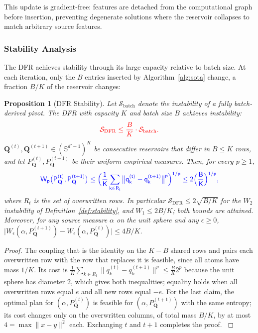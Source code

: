 \documentclass[preprint,12pt]{elsarticle}
\newtheorem{proposition}[theorem]{Proposition}
\providecommand{\DIFadd}[1]{{\protect\color{blue} \sf #1}} %
\providecommand{\DIFdel}[1]{{\protect\color{red} \scriptsize #1}} %
\providecommand{\DIFaddbegin}{} %
\providecommand{\DIFaddend}{} %
\providecommand{\DIFdelbegin}{} %
\providecommand{\DIFdelend}{} %
\newcommand{\DIFscaledelfig}{0.5}
\newlength{\DIFdelgraphicswidth} %
\newlength{\DIFdelgraphicsheight} %
\newcommand{\DIFaddincludegraphics}[2][]{{\color{blue}\fbox{\DIFOincludegraphics[#1]{#2}}}} %
\newcommand{\DIFdelincludegraphics}[2][]{%
\sbox{\DIFdelgraphicsbox}{\DIFOincludegraphics[#1]{#2}}%
\settoboxwidth{\DIFdelgraphicswidth}{\DIFdelgraphicsbox} %
\settoboxtotalheight{\DIFdelgraphicsheight}{\DIFdelgraphicsbox} %
\scalebox{\DIFscaledelfig}{%
\parbox[b]{\DIFdelgraphicswidth}{\usebox{\DIFdelgraphicsbox}\\[-\baselineskip] \rule{\DIFdelgraphicswidth}{0em}}\llap{\resizebox{\DIFdelgraphicswidth}{\DIFdelgraphicsheight}{%
\setlength{\unitlength}{\DIFdelgraphicswidth}%
\begin{picture}(1,1)%
\thicklines\linethickness{2pt} %
{\color[rgb]{1,0,0}\put(0,0){\framebox(1,1){}}}%
{\color[rgb]{1,0,0}\put(0,0){\line( 1,1){1}}}%
{\color[rgb]{1,0,0}\put(0,1){\line(1,-1){1}}}%
\end{picture}%
}\hspace*{3pt}}} %
} %
\DeclareRobustCommand{\DIFaddbegin}{\DIFOaddbegin \let\includegraphics\DIFaddincludegraphics} %
\DeclareRobustCommand{\DIFaddend}{\DIFOaddend \let\includegraphics\DIFOincludegraphics} %
\DeclareRobustCommand{\DIFdelbegin}{\DIFOdelbegin \let\includegraphics\DIFdelincludegraphics} %
\DeclareRobustCommand{\DIFdelend}{\DIFOaddend \let\includegraphics\DIFOincludegraphics} %
\begin{document}
This update is gradient-free: features are detached from the computational graph before insertion, preventing degenerate solutions where the reservoir collapses to match arbitrary source features.

\subsubsection{Stability Analysis}

The DFR achieves stability through its large capacity relative to batch size. At each iteration, only \DIFaddbegin \DIFadd{the $B$ entries inserted by Algorithm~\ref{alg:sota} change, a }\DIFaddend fraction $B/K$ of the reservoir\DIFdelbegin \DIFdel{changes}\DIFdelend :

\begin{proposition}[DFR Stability]
\label{prop:dfr_stability}
Let \DIFdelbegin \DIFdel{$\mathcal{S}_{\text{batch}}$ denote the instability of a fully batch-derived pivot. The DFR with capacity $K$ and batch size $B$ achieves instability:
}\begin{displaymath}
    \DIFdel{\mathcal{S}_{\text{DFR}} \leq \frac{B}{K} \cdot \mathcal{S}_{\text{batch}}.
}\end{displaymath}%
\DIFdelend \DIFaddbegin \DIFadd{$\mathbf Q^{(t)},\mathbf Q^{(t+1)}\in(\mathbb S^{d'-1})^K$ be consecutive reservoirs that differ in $B\le K$ rows, and let $P_{\mathbf Q}^{(t)},P_{\mathbf Q}^{(t+1)}$ be their uniform empirical measures. Then, for every $p\ge1$,
}\begin{equation}
    \DIFadd{W_p\big(P_{\mathbf Q}^{(t)},P_{\mathbf Q}^{(t+1)}\big)\le\Big(\frac{1}K\sum_{k\in R_t}\big\|q^{(t)}_k-q^{(t+1)}_k\big\|^p\Big)^{1/p}\le2\Big(\frac{B}K\Big)^{1/p},
}\end{equation}\DIFaddend 
\DIFaddbegin \DIFadd{where $R_t$ is the set of overwritten rows. In particular $\mathcal S_{\text{DFR}}\le2\sqrt{B/K}$ for the $W_2$ instability of Definition~\ref{def:stability}, and $W_1\le2B/K$; both bounds are attained. Moreover, for any source measure $\alpha$ on the unit sphere and any $\epsilon\ge0$, $\big|W_\epsilon(\alpha,P_{\mathbf Q}^{(t+1)})-W_\epsilon(\alpha,P_{\mathbf Q}^{(t)})\big|\le4B/K$.
}\DIFaddend \end{proposition}
\DIFaddbegin \begin{proof}
\DIFadd{The coupling that is the identity on the $K-B$ shared rows and pairs each overwritten row with the row that replaces it is feasible, since all atoms have mass $1/K$. Its cost is $\frac{1}K\sum_{k\in R_t}\|q^{(t)}_k-q^{(t+1)}_k\|^p\le\frac{B}K2^p$ because the unit sphere has diameter $2$, which gives both inequalities; equality holds when all overwritten rows equal $e$ and all new rows equal $-e$. For the last claim, the optimal plan for $(\alpha,P_{\mathbf Q}^{(t)})$ is feasible for $(\alpha,P_{\mathbf Q}^{(t+1)})$ with the same entropy; its cost changes only on the overwritten columns, of total mass $B/K$, by at most $4=\max\|x-y\|^2$ each. Exchanging $t$ and $t+1$ completes the proof.
}\end{proof}
\DIFaddend 
\end{document}
